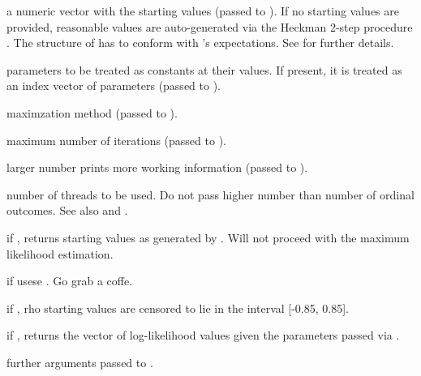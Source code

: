 \begin{Arguments}
\begin{ldescription}
\item[\code{start}] a numeric vector with the starting values (passed to ).
If no starting values are provided, reasonable values are auto-generated via
the Heckman 2-step procedure . The structure of  has to
conform with 's expectations. See  for further details.

\item[\code{fixed}] parameters to be treated as constants at their  values. If
present, it is treated as an index vector of  parameters (passed to
).

\item[\code{method}] maximzation method (passed to ).

\item[\code{iterlim}] maximum number of iterations (passed to ).

\item[\code{printLevel}] larger number prints more working information (passed to ).

\item[\code{nThreads}] number of threads to be used. Do not pass higher number than
number of ordinal outcomes. See also  and .

\item[\code{.get2step}] if , returns starting values as generated by . Will
not proceed with the maximum likelihood estimation.

\item[\code{.useR}] if  usese . Go grab a coffe.

\item[\code{.censorRho}] if , rho starting values are censored to lie in the
interval [-0.85, 0.85].

\item[\code{.loglik}] if , returns the vector of log-likelihood values given
the parameters passed via .

\item[\code{...}] further arguments passed to .
\end{ldescription}
\end{Arguments}
